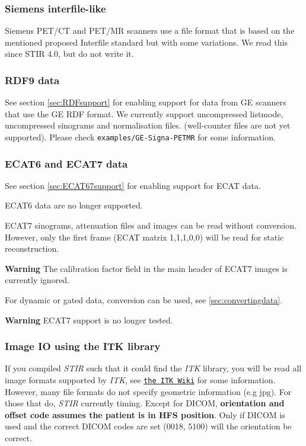 \documentclass{article}
\def\url#1#2{\mbox{\href{#1}{\tt #2}}}
\begin{document}
\subsubsection{Siemens interfile-like}
Siemens PET/CT and PET/MR scanners use a file format that is based on the mentioned
proposed Interfile standard but with some variations. We read this since STIR 4.0,
but do not write it.

\subsubsection{RDF9 data}
See section \ref{sec:RDFsupport} for enabling support for data from GE scanners
that use the GE RDF format. We currently support uncompressed listmode,
uncompressed sinograms and normalisation files. (well-counter files are not
yet supported). Please check \texttt{examples/GE-Signa-PETMR} for some
information.

\subsubsection{ECAT6 and ECAT7 data} 
See section \ref{sec:ECAT67support} for enabling support for ECAT data.

ECAT6 data are no longer supported.

ECAT7 sinograms, attenuation files and images can be read without 
conversion. However, only the first frame (ECAT matrix 1,1,1,0,0) 
will be read for static reconstruction.

\textbf{Warning} The calibration factor field in the main header of ECAT7 images
is currently ignored.

For dynamic or gated data, conversion can be used, see \ref{sec:convertingdata}.

\textbf{Warning} ECAT7 support is no longer tested.

\subsubsection{Image IO using the ITK library \label{sec:ITKIO}}
If you compiled \textit{STIR} such that it could find the \textit{ITK} library, you will be read
all image formats supported by \textit{ITK}, see \url{http://www.itk.org/Wiki/ITK/File_Formats}{the ITK Wiki}
for some information. However, many file formats do not specify geometric information (e.g jpg). For those
that do, \textit{STIR} currently timing. Except for DICOM, \textbf{orientation and offset code
assumes the patient is in HFS position}. Only if DICOM is used and the correct DICOM codes are set
(0018, 5100) will the orientation be correct.
\end{document}
